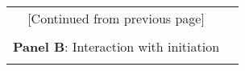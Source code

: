 \begin{table}[H] \begin{center} \begin{threeparttable} 
	\begin{tabular*}{\hsize}{@{\hskip\tabcolsep\extracolsep\fill}l*{6}{c}}
			 \multicolumn{6}{c}{[Continued from previous page]} \\ \\
			 \multicolumn{6}{l}{\textbf{Panel B}: Interaction with initiation} \\
			\toprule  \def\sym#1{\ifmmode^{#1}\else\(^{#1}\)\fi}

		  
		\bottomrule \end{tabular*}
	\end{threeparttable}   \end{center} \end{table}
\clearpage \newpage


